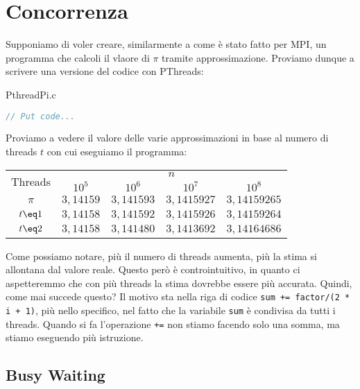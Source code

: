 \section{Concorrenza}

Supponiamo di voler creare, similarmente a come è stato fatto per MPI, un programma che calcoli il vlaore di $\pi$ tramite approssimazione. Proviamo dunque a scrivere una versione del codice con PThreads:

\begin{codeblock}{PthreadPi.c}
    \begin{lstlisting}[language = C]
// Put code...\end{lstlisting}
\end{codeblock}

Proviamo a vedere il valore delle varie approssimazioni in base al numero di threads $t$ con cui eseguiamo il programma:

\begin{center}
    \begin{tabular}{|c||c|c|c|c|}
        \hline
        \multirow{2}{*}{Threads} & \multicolumn{4}{c|}{$n$} \\
        \cline{2-5}\rule{0pt}{2.5ex} 
        & $10^5$ & $10^6$ & $10^7$ & $10^8$ \\
        \hline\hline
        $\pi$ & $3,14159$ & $3,141593$ & $3,1415927$ & $3,14159265$ \\
        \hline
        $t \eq 1$ & $3,14158$ & $3,141592$ & $3,1415926$ & $3,14159264$ \\
        \hline
        $t \eq 2$ & $3,14158$ & $3,141480$ & $3,1413692$ & $3,14164686$ \\
        \hline
    \end{tabular}
\end{center}

Come possiamo notare, più il numero di threads aumenta, più la stima si allontana dal valore reale. Questo però è controintuitivo, in quanto ci aspetteremmo che con più threads la stima dovrebbe essere più accurata. Quindi, come mai succede questo?
\nwl
Il motivo sta nella riga di codice \verb|sum += factor/(2 * i + 1)|, più nello specifico, nel fatto che la variabile \verb|sum| è condivisa da tutti i threads. Quando si fa l'operazione \verb|+=| non stiamo facendo solo una somma, ma stiamo eseguendo più istruzione.

\subsection{Busy Waiting}

